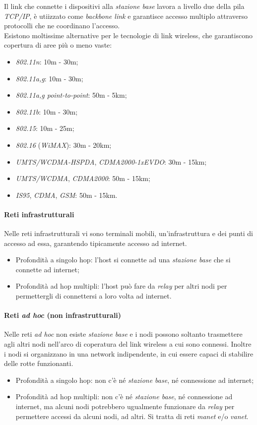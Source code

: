 Il link che connette i dispositivi alla \textit{stazione base} lavora a livello due della pila \textit{TCP/IP}, è utiizzato come \textit{backbone link} e garantisce accesso multiplo attraverso protocolli che ne coordinano l'accesso. \\
Esistono moltissime alternative per le tecnologie di link wireless, che garantiscono copertura di aree più o meno vaste:
\begin{itemize}
	\item \textit{802.11n}: 10m - 30m;
	\item \textit{802.11a,g}: 10m - 30m;
	\item \textit{802.11a,g point-to-point}: 50m - 5km;
	\item \textit{802.11b}: 10m - 30m;
	\item \textit{802.15}: 10m - 25m;
	\item \textit{802.16} (\textit{WiMAX}): 30m - 20km;
	\item \textit{UMTS/WCDMA-HSPDA}, \textit{CDMA2000-1xEVDO}: 30m - 15km;
	\item \textit{UMTS/WCDMA}, \textit{CDMA2000}: 50m - 15km;
	\item \textit{IS95}, \textit{CDMA}, \textit{GSM}: 50m - 15km.
\end{itemize}

\paragraph{Reti infrastrutturali}
Nelle reti infrastrutturali vi sono terminali mobili, un'infrastruttura e dei punti di accesso ad essa, garantendo tipicamente accesso ad internet.
\begin{itemize}
	\item Profondità a singolo hop: l'host si connette ad una \textit{stazione base} che si connette ad internet;
	\item Profondità ad hop multipli: l'host può fare da \textit{relay} per altri nodi per permettergli di connettersi a loro volta ad internet.
\end{itemize}

\paragraph{Reti \textit{ad hoc} (non infrastrutturali)}
Nelle reti \textit{ad hoc} non esiste \textit{stazione base} e i nodi possono soltanto trasmettere agli altri nodi nell'arco di coperatura del link wireless a cui sono connessi. Inoltre i nodi si organizzano in una network indipendente, in cui essere capaci di stabilire delle rotte funzionanti.
\begin{itemize}
	\item Profondità a singolo hop: non c'è né \textit{stazione base}, né connessione ad internet;
	\item Profondità ad hop multipli: non c'è né \textit{stazione base}, né connessione ad internet, ma alcuni nodi potrebbero ugualmente funzionare da \textit{relay} per permettere accessi da alcuni nodi, ad altri. Si tratta di reti \textit{manet} e/o \textit{vanet}.
\end{itemize}

